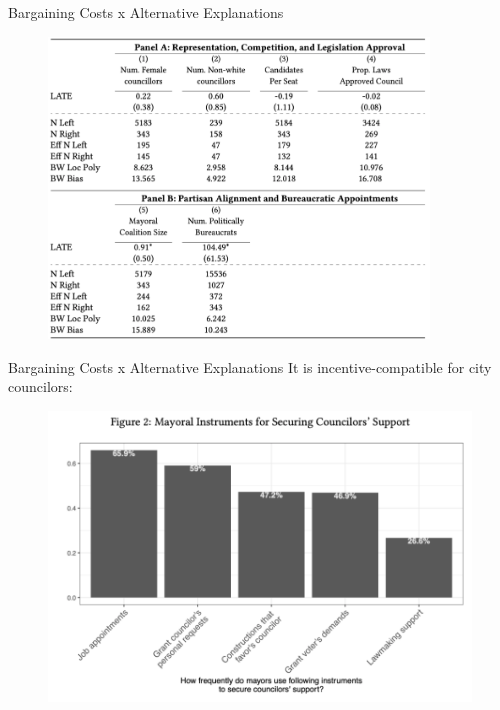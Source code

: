 \documentclass[11pt]{beamer}
\begin{document}
\begin{frame}{Bargaining Costs x Alternative Explanations}
  \begin{figure}[htb]
   \centering
   \includegraphics[width=0.9\textwidth]{fig1.png}
  \end{figure}
\end{frame}

\begin{frame}{Bargaining Costs x Alternative Explanations}
It is incentive-compatible for city councilors:
  \begin{figure}[htb]
   \centering
   \includegraphics[width=1\textwidth]{fig2.png}
  \end{figure}
\end{frame}
\end{document}
